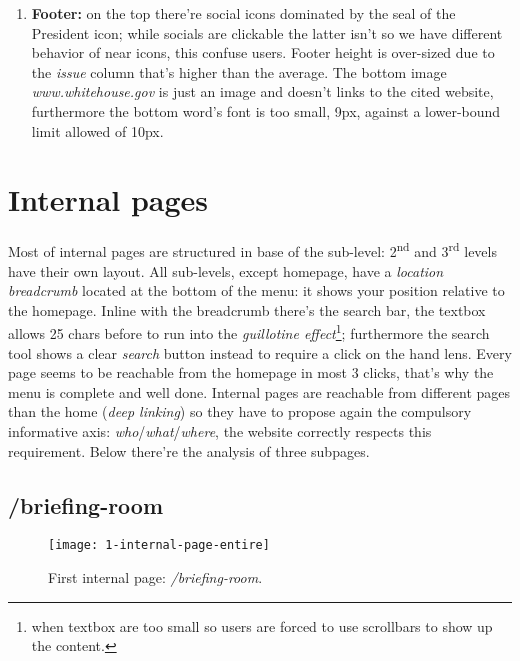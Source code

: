 \documentclass[
10pt, %
a4paper, %
oneside, %
headinclude,footinclude, %
BCOR5mm, %
]{scrartcl}
\begin{document}
\begin{enumerate}
		\item \textbf{Footer:} on the top there're social icons dominated by the seal of the President icon; while socials are clickable the latter isn't so we have different behavior of near icons, this confuse users.
		Footer height is over-sized due to the \emph{issue} column that's higher than the average. The bottom image \emph{www.whitehouse.gov} is just an image and doesn't links to the cited website, furthermore the bottom word's font is too small, 9px, against a lower-bound limit allowed of 10px. 
		
	\end{enumerate}


\section{Internal pages}
Most of internal pages are structured in base of the sub-level: 2\textsuperscript{nd} and 3\textsuperscript{rd} levels have their own layout.
All sub-levels, except homepage, have a \emph{location breadcrumb} located at the bottom of the menu: it shows your position relative to the homepage. Inline with the breadcrumb there's the search bar, the textbox allows 25 chars before to run into the \emph{guillotine effect}\footnote{when textbox are too small so users are forced to use scrollbars to show up the content.}; furthermore the search tool shows a clear \emph{search} button instead to require a click on the hand lens. 
Every page seems to be reachable from the homepage in most 3 clicks, that's why the menu is complete and well done. 
Internal pages are reachable from different pages than the home (\emph{deep linking}) so they have to propose again the compulsory informative axis: \emph{who}/\emph{what}/\emph{where}, the website correctly respects this requirement.
Below there're the analysis of three subpages.

	\subsection{/briefing-room}
	\label{primapaginainterna}
	

	\begin{figure}[h!]
	\centering 
	\centerline{\texttt{[image: 1-internal-page-entire]}}
	\caption[First internal page: /briefing-room]{First internal page: \emph{/briefing-room}.}
	\label{fig:primapaginainterna} 
	\end{figure}
\end{document}
